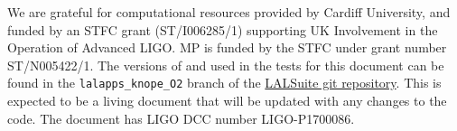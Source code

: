 \acknowledgements

We are grateful for computational resources provided by Cardiff University, and funded by an STFC grant (ST/I006285/1) supporting UK Involvement in
the Operation of Advanced LIGO. MP is funded by the STFC under grant number ST/N005422/1. The versions of \lppenf and \lppef used in the tests for this document
can be found in the {\tt lalapps\_knope\_O2} branch of the \href{https://github.com/lscsoft/lalsuite/tree/lalapps_knope_O2}{LALSuite git repository}. This is expected
to be a living document that will be updated with any changes to the code. The document has LIGO DCC number LIGO-P1700086.
